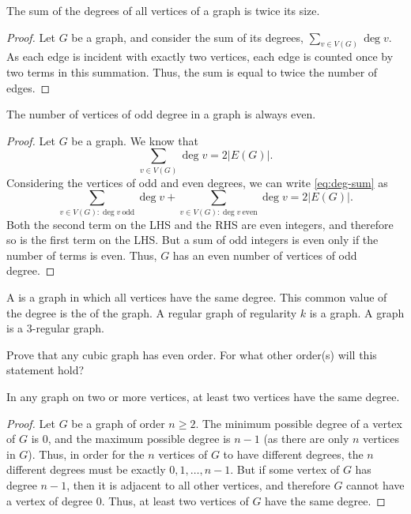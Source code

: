 \begin{Lemma}
The sum of the degrees of all vertices of a graph is twice its size.
\end{Lemma}

\begin{proof}
Let $G$ be a graph, and consider the sum of its degrees, $\sum_{v \in V(G)} \deg v$. As each edge is incident with exactly two vertices, each edge is counted once by two terms in this summation. Thus, the sum is equal to twice the number of edges.
\end{proof}

\begin{Corollary}
The number of vertices of odd degree in a graph is always even.
\end{Corollary}

\begin{proof}
Let $G$ be a graph. We know that
\begin{equation}
\sum_{v \in V(G)} \deg v = 2 |E(G)|. \label{eq:deg-sum}
\end{equation}
Considering the vertices of odd and even degrees, we can write \eqref{eq:deg-sum} as
\begin{equation}
\sum_{v \in V(G) : \deg v\ \text{odd}} \deg v + \sum_{v \in V(G) : \deg v\ \text{even}} \deg v = 2 |E(G)|.
\end{equation}
Both the second term on the LHS and the RHS are even integers, and therefore so is the first term on the LHS. But a sum of odd integers is even only if the number of terms is even. Thus, $G$ has an even number of vertices of odd degree.
\end{proof}

A  is a graph in which all vertices have the same degree. This common value of the degree is the  of the graph. A regular graph of regularity $k$ is a  graph. A  graph is a $3$-regular graph.

\begin{Exercise}
Prove that any cubic graph has even order. For what other order(s) will this statement hold?
\end{Exercise}

\begin{Theorem}
In any graph on two or more vertices, at least two vertices have the same degree.
\end{Theorem}

\begin{proof}
Let $G$ be a graph of order $n \ge 2$. The minimum possible degree of a vertex of $G$ is $0$, and the maximum possible degree is $n - 1$ (as there are only $n$ vertices in $G$). Thus, in order for the $n$ vertices of $G$ to have different degrees, the $n$ different degrees must be exactly $0, 1, \ldots, n - 1$. But if some vertex of $G$ has degree $n - 1$, then it is adjacent to all other vertices, and therefore $G$ cannot have a vertex of degree $0$. Thus, at least two vertices of $G$ have the same degree.
\end{proof}

